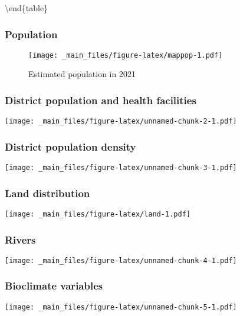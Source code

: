 \documentclass[
]{article}
\begin{document}
\textbackslash end\{table\}

\hypertarget{population}{%
\subsubsection{Population}\label{population}}

\begin{figure}
\centering
\texttt{[image: \_main\_files/figure-latex/mappop-1.pdf]}
\caption{\label{fig:mappop}Estimated population in 2021}
\end{figure}

\hypertarget{district-population-and-health-facilities}{%
\subsubsection{District population and health facilities}\label{district-population-and-health-facilities}}

\texttt{[image: \_main\_files/figure-latex/unnamed-chunk-2-1.pdf]}

\hypertarget{district-population-density}{%
\subsubsection{District population density}\label{district-population-density}}

\texttt{[image: \_main\_files/figure-latex/unnamed-chunk-3-1.pdf]}

\hypertarget{land-distribution}{%
\subsubsection{Land distribution}\label{land-distribution}}

\texttt{[image: \_main\_files/figure-latex/land-1.pdf]}

\hypertarget{rivers}{%
\subsubsection{Rivers}\label{rivers}}

\texttt{[image: \_main\_files/figure-latex/unnamed-chunk-4-1.pdf]}

\hypertarget{bioclimate-variables}{%
\subsubsection{Bioclimate variables}\label{bioclimate-variables}}

\texttt{[image: \_main\_files/figure-latex/unnamed-chunk-5-1.pdf]}
\end{document}
